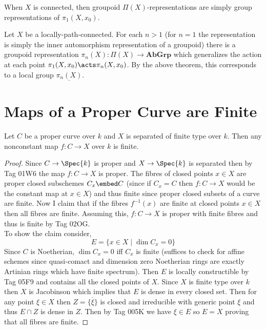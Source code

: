\documentclass[12pt]{article}
\newcommand{\AbGrp}{\mathbf{AbGrp}}
\begin{document}
\begin{remark}
When $X$ is connected, then groupoid $\Pi(X)$-representations are simply group representations of $\pi_1(X,x_0)$.
\end{remark}

\begin{definition}
Let $X$ be a locally-path-connected. For each $n > 1$ (for $n = 1$ the representation is simply the inner automorphism representation of a groupoid) there is a groupoid representation $\pi_n(X) : \Pi(X) \to \AbGrp$ which generalizes the action at each point $\pi_1(X, x_0) \acts \pi_n(X, x_0)$. By the above theorem, this corresponds to a local group $\underline{\pi_n(X)}$. 
\end{definition}

\section{Maps of a Proper Curve are Finite}

\begin{theorem}
Let $C$ be a proper curve over $k$ and $X$ is separated of finite type over $k$. Then any nonconstant map $f : C \to X$ over $k$ is finite.
\end{theorem}

\begin{proof}
Since $C \to \Spec{k}$ is proper and $X \to \Spec{k}$ is separated then by Tag 01W6 the map $f : C \to X$ is proper. The fibres of closed points $x \in X$ are proper closed subschemes $C_x \embed C$ (since if $C_x = C$ then $f : C \to X$ would be the constant map at $x \in X$) and thus finite since proper closed subsets of a curve are finite. Now I claim that if the fibres $f^{-1}(x)$ are finite at closed points $x \in X$ then all fibres are finite. Assuming this, $f : C \to X$ is proper with finite fibres and thus is finite by Tag 02OG.
\bigskip\\
To show the claim consider,
\[ E = \{ x \in X \mid \dim{C_x} = 0 \} \]   
Since $C$ is Noetherian, $\dim{C_x} = 0$ iff $C_x$ is finite (suffices to check for affine schemes since quasi-comact and dimension zero Noetherian rings are exactly Artinian rings which have finite spectrum). Then $E$ is locally constructible by Tag 05F9 and contains all the closed points of $X$. Since $X$ is finite type over $k$ then $X$ is Jacobinson which implies that $E$ is dense in every closed set. Then for any point $\xi \in X$ then $Z = \overline{\{ \xi \}}$ is closed and irreducible with generic point $\xi$ and thus $E \cap Z$ is dense in $Z$. Then by Tag 005K we have $\xi \in E$ so $E = X$ proving that all fibres are finite.
\end{proof}
\end{document}
